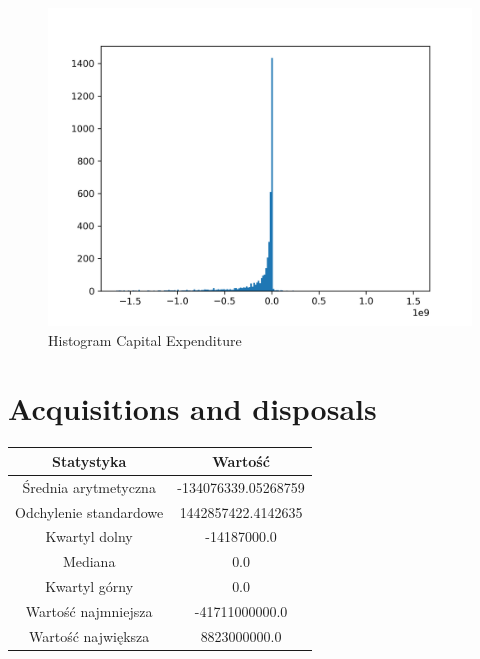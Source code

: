 \documentclass{article}
\begin{document}
\begin{figure}[h!]
    \includegraphics[width=\linewidth]{variables/Capital Expenditure.png}
    \caption{Histogram Capital Expenditure }
\end{figure}\section{ Acquisitions and disposals }

\begin{center}
    \begin{tabular}{|c | c|} 
    \hline
    Statystyka & Wartość \\
    \hline\hline
    Średnia arytmetyczna & -134076339.05268759 \\ 
    \hline
    Odchylenie standardowe & 1442857422.4142635 \\
    \hline
    Kwartyl dolny & -14187000.0 \\
    \hline
    Mediana & 0.0 \\
    \hline
    Kwartyl górny & 0.0 \\
    \hline
    Wartość najmniejsza & -41711000000.0 \\
    \hline
    Wartość największa & 8823000000.0 \\
    \hline
   \end{tabular}
\end{center}
\end{document}
